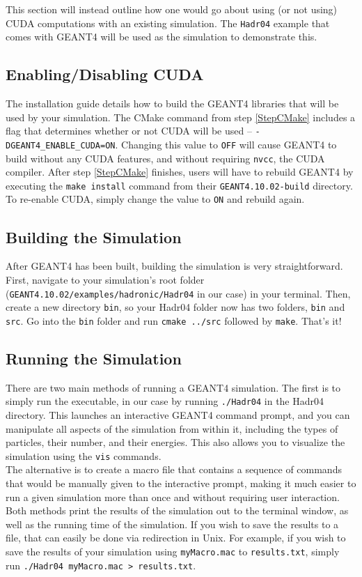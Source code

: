 \documentclass[12pt]{article}
\begin{document}
This section will instead outline how one would go about using (or not using) CUDA computations with an existing simulation. The \texttt{Hadr04} example that comes with GEANT4 will be used as the simulation to demonstrate this.

\subsection{Enabling/Disabling CUDA} %
The installation guide details how to build the GEANT4 libraries that will be used by your simulation. The CMake command from step \ref{StepCMake} includes a flag that determines whether or not CUDA will be used -- \texttt{-DGEANT4\_ENABLE\_CUDA=ON}. Changing this value to \texttt{OFF} will cause GEANT4 to build without any CUDA features, and without requiring \texttt{nvcc}, the CUDA compiler. After step \ref{StepCMake} finishes, users will have to rebuild GEANT4 by executing the \texttt{make install} command from their \texttt{GEANT4.10.02-build} directory. To re-enable CUDA, simply change the value to \texttt{ON} and rebuild again.

\subsection{Building the Simulation}\label{SecSimulations} %
After GEANT4 has been built, building the simulation is very straightforward. First, navigate to your simulation's root folder (\texttt{GEANT4.10.02/examples/hadronic/Hadr04} in our case) in your terminal. Then, create a new directory \texttt{bin}, so your Hadr04 folder now has two folders, \texttt{bin} and \texttt{src}. Go into the \texttt{bin} folder and run \texttt{cmake ../src} followed by \texttt{make}. That's it!

\subsection{Running the Simulation}\label{SecRedirect} %
There are two main methods of running a GEANT4 simulation. The first is to simply run the executable, in our case by running \texttt{./Hadr04} in the Hadr04 directory. This launches an interactive GEANT4 command prompt, and you can manipulate all aspects of the simulation from within it, including the types of particles, their number, and their energies. This also allows you to visualize the simulation using the \texttt{vis} commands.\\

The alternative is to create a macro file that contains a sequence of commands that would be manually given to the interactive prompt, making it much easier to run a given simulation more than once and without requiring user interaction. Both methods print the results of the simulation out to the terminal window, as well as the running time of the simulation. If you wish to save the results to a file, that can easily be done via redirection in Unix. For example, if you wish to save the results of your simulation using \texttt{myMacro.mac} to \texttt{results.txt}, simply run \texttt{./Hadr04 myMacro.mac > results.txt}.
\end{document}

